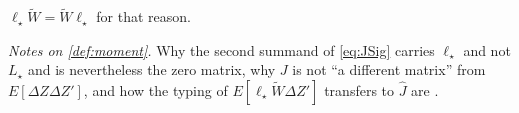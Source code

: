 \begin{definition}
$\ell_\star\widetilde W=\widetilde W\ell_\star$ for that reason.
\end{definition}

\noindent\emph{Notes on \cref{def:moment}.} Why the second summand of \eqref{eq:JSig} carries
$\ell_\star$ and not $L_\star$ and is nevertheless the zero matrix, why $J$ is not ``a different matrix''
from $E[\Delta Z\Delta Z']$, and how the typing of $E[\ell_\star\widetilde W\Delta Z']$ transfers to
$\hat J$ are .


